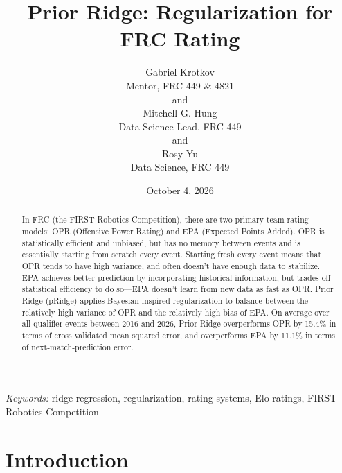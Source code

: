 \documentclass[
  12pt]{article}
\begin{document}
\def\spacingset#1{\renewcommand{\baselinestretch}%
{#1}\small\normalsize} \spacingset{1}



\date{October 4, 2026}
\title{\bf Prior Ridge: Regularization for FRC Rating}
\author{
Gabriel Krotkov\\
Mentor, FRC 449 \& 4821\\
and\\Mitchell G. Hung\\
Data Science Lead, FRC 449\\
and\\Rosy Yu\\
Data Science, FRC 449\\
}
\maketitle

\bigskip
\bigskip
\begin{abstract}
In FRC (the FIRST Robotics Competition), there are two primary team
rating models: OPR (Offensive Power Rating) and EPA (Expected Points
Added). OPR is statistically efficient and unbiased, but has no memory
between events and is essentially starting from scratch every event.
Starting fresh every event means that OPR tends to have high variance,
and often doesn't have enough data to stabilize. EPA achieves better
prediction by incorporating historical information, but trades off
statistical efficiency to do so---EPA doesn't learn from new data as
fast as OPR. Prior Ridge (pRidge) applies Bayesian-inspired
regularization to balance between the relatively high variance of OPR
and the relatively high bias of EPA. On average over all qualifier
events between 2016 and 2026, Prior Ridge overperforms OPR by 15.4\% in
terms of cross validated mean squared error, and overperforms EPA by
11.1\% in terms of next-match-prediction error.
\end{abstract}

\noindent%
{\it Keywords:} ridge regression, regularization, rating systems, Elo
ratings, FIRST Robotics Competition
\vfill

\newpage
\spacingset{1.9} %


\section{Introduction}\label{introduction}
\end{document}
